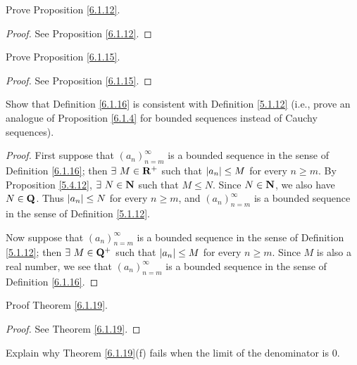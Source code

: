 \begin{exercise}\label{ex 6.1.5}
    Prove Proposition \ref{6.1.12}.
\end{exercise}

\begin{proof}
    See Proposition \ref{6.1.12}.
\end{proof}

\begin{exercise}\label{ex 6.1.6}
    Prove Proposition \ref{6.1.15}.
\end{exercise}

\begin{proof}
    See Proposition \ref{6.1.15}.
\end{proof}

\begin{exercise}\label{ex 6.1.7}
    Show that Definition \ref{6.1.16} is consistent with Definition \ref{5.1.12}
    (i.e., prove an analogue of Proposition \ref{6.1.4} for bounded sequences instead of Cauchy sequences).
\end{exercise}

\begin{proof}
    First suppose that \((a_n)_{n = m}^\infty\) is a bounded sequence in the sense of Definition \ref{6.1.16};
    then \(\exists\ M \in \mathbf{R}^+\) such that \(\left\lvert a_n\right\rvert \leq M\) for every \(n \geq m\).
    By Proposition \ref{5.4.12}, \(\exists\ N \in \mathbf{N}\) such that \(M \leq N\).
    Since \(N \in \mathbf{N}\), we also have \(N \in \mathbf{Q}\).
    Thus \(\left\lvert a_n\right\rvert \leq N\) for every \(n \geq m\), and \((a_n)_{n = m}^\infty\) is a bounded sequence in the sense of Definition \ref{5.1.12}.

    Now suppose that \((a_n)_{n = m}^\infty\) is a bounded sequence in the sense of Definition \ref{5.1.12};
    then \(\exists\ M \in \mathbf{Q}^+\) such that \(\left\lvert a_n\right\rvert \leq M\) for every \(n \geq m\).
    Since \(M\) is also a real number, we see that \((a_n)_{n = m}^\infty\) is a bounded sequence in the sense of Definition \ref{6.1.16}.
\end{proof}

\begin{exercise}\label{ex 6.1.8}
    Proof Theorem \ref{6.1.19}.
\end{exercise}

\begin{proof}
    See Theorem \ref{6.1.19}.
\end{proof}

\begin{exercise}\label{ex 6.1.9}
    Explain why Theorem \ref{6.1.19}(f) fails when the limit of the denominator is \(0\).
\end{exercise}

